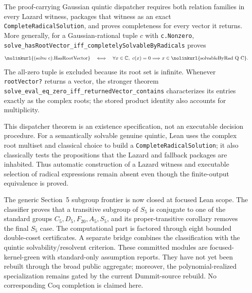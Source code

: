 \documentclass[11pt,a4paper,oneside]{article}
\newcommand{\lean}[1]{\nolinkurl{#1}}
\begin{document}
The proof-carrying Gaussian quintic dispatcher requires both relation families
in every Lazard witness, packages that witness as an exact
\lean{CompleteRadicalSolution}, and proves completeness for every vector it
returns.  More generally, for a Gaussian-rational tuple $c$ with
\lean{c.Nonzero},
\lean{solve_hasRootVector_iff_completelySolvableByRadicals} proves
\[
 \text{\lean{(solve c).HasRootVector}}
 \quad\Longleftrightarrow\quad
 \forall x\in\mathbb C,\ c(x)=0\Longrightarrow
 x\in\text{\lean{solvableByRad Q C}}.
\]
The all-zero tuple is excluded because its root set is infinite.  Whenever
\lean{rootVector?} returns a vector, the stronger theorem
\lean{solve_eval_eq_zero_iff_returnedVector_contains} characterizes its entries
exactly as the complex roots; the stored product identity also accounts for
multiplicity.

This dispatcher theorem is an existence specification, not an executable
decision procedure.  For a semantically solvable genuine quintic, Lean uses
the complex root multiset and classical choice to build a
\lean{CompleteRadicalSolution}; it also classically tests the propositions that
the Lazard and fallback packages are inhabited.  Thus automatic construction
of a Lazard witness and executable selection of radical expressions remain
absent even though the finite-output equivalence is proved.

The generic Section~5 subgroup frontier is now closed at focused Lean scope.
The classifier proves that a transitive subgroup of $S_5$ is conjugate to one
of the standard groups $C_5,D_5,F_{20},A_5,S_5$, and its proper-transitive
corollary removes the final $S_5$ case.  The computational part is factored
through eight bounded double-coset certificates.  A separate bridge combines
the classification with the quintic solvability/resolvent criterion.  These
committed modules are focused-kernel-green with standard-only assumption
reports.  They have not yet been rebuilt through the broad public aggregate;
moreover, the polynomial-realized specialization remains gated by the current
Dummit-source rebuild.  No corresponding Coq completion is claimed here.
\end{document}
